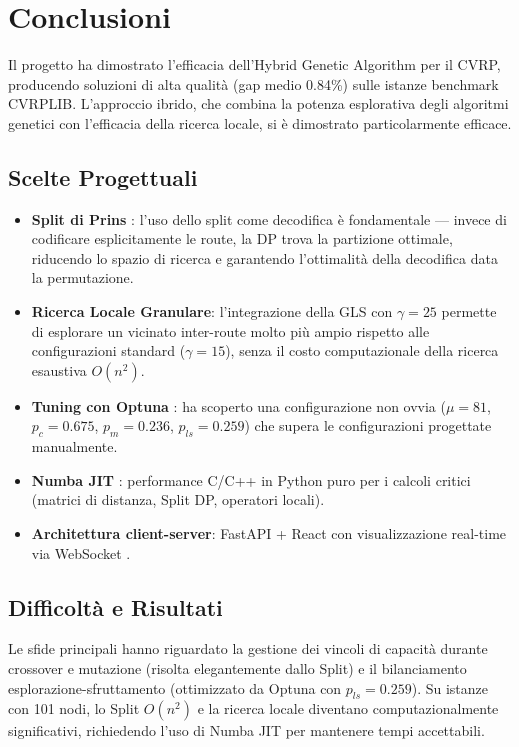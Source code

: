 \section{Conclusioni}

Il progetto ha dimostrato l'efficacia dell'Hybrid Genetic Algorithm per il
CVRP, producendo soluzioni di alta qualit\`a (gap medio 0.84\%) sulle istanze
benchmark CVRPLIB. L'approccio ibrido, che combina la potenza esplorativa degli
algoritmi genetici con l'efficacia della ricerca locale, si \`e dimostrato
particolarmente efficace.

\subsection{Scelte Progettuali}

\begin{itemize}[nosep]
    \item \textbf{Split di Prins} \cite{prins2004simple}: l'uso dello split come
    decodifica \`e fondamentale --- invece di codificare esplicitamente le route,
    la DP trova la partizione ottimale, riducendo lo spazio di ricerca e
    garantendo l'ottimalit\`a della decodifica data la permutazione.
    \item \textbf{Ricerca Locale Granulare}: l'integrazione della GLS con
    $\gamma=25$ permette di esplorare un vicinato inter-route molto pi\`u
    ampio rispetto alle configurazioni standard ($\gamma=15$), senza il
    costo computazionale della ricerca esaustiva $O(n^2)$.
    \item \textbf{Tuning con Optuna} \cite{akiba2019optuna}: ha scoperto una
    configurazione non ovvia ($\mu=81$, $p_c=0.675$, $p_m=0.236$, $p_{ls}=0.259$)
    che supera le configurazioni progettate manualmente.
    \item \textbf{Numba JIT} \cite{lam2015numba}: performance C/C++ in Python
    puro per i calcoli critici (matrici di distanza, Split DP, operatori locali).
    \item \textbf{Architettura client-server}: FastAPI + React con
    visualizzazione real-time via WebSocket \cite{fastapi}.
\end{itemize}

\subsection{Difficolt\`a e Risultati}

Le sfide principali hanno riguardato la gestione dei vincoli di capacit\`a
durante crossover e mutazione (risolta elegantemente dallo Split) e il
bilanciamento esplorazione-sfruttamento (ottimizzato da Optuna con
$p_{ls}=0.259$). Su istanze con 101 nodi, lo Split $O(n^2)$ e la ricerca
locale diventano computazionalmente significativi, richiedendo l'uso di Numba
JIT per mantenere tempi accettabili.


